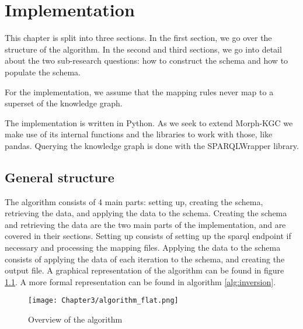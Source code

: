 \chapter{Implementation}
\label{chapter:implementation}
This chapter is split into three sections. In the first section, we go over the structure of the algorithm. In the second and third sections, we go into detail about the two sub-research questions: how to construct the schema and how to populate the schema. 



For the implementation, we assume that the mapping rules never map to a superset of the knowledge graph. 

The implementation is written in Python. As we seek to extend Morph-KGC we make use of its internal functions and the libraries to work with those, like pandas. Querying the knowledge graph is done with the SPARQLWrapper library.

\section{General structure}
The algorithm consists of 4 main parts: setting up, creating the schema, retrieving the data, and applying the data to the schema. Creating the schema and retrieving the data are the two main parts of the implementation, and are covered in their sections. Setting up consists of setting up the \acrshort{sparql} endpoint if necessary and processing the mapping files. Applying the data to the schema consists of applying the data of each iteration to the schema, and creating the output file. A graphical representation of the algorithm can be found in figure \ref{fig:algorithm}. A more formal representation can be found in algorithm \ref{alg:inversion}.

\begin{figure}[h]
    \centering
    \texttt{[image: Chapter3/algorithm\_flat.png]}
    \caption{Overview of the algorithm}
    \label{fig:algorithm}
\end{figure}

